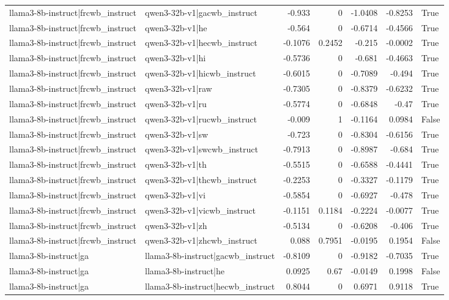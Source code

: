 \begin{table}
\begin{tabular}{l l r r r r l}
llama3-8b-instruct|frcwb_instruct & qwen3-32b-v1|gacwb_instruct & -0.933 & 0 & -1.0408 & -0.8253 & True \\
llama3-8b-instruct|frcwb_instruct & qwen3-32b-v1|he & -0.564 & 0 & -0.6714 & -0.4566 & True \\
llama3-8b-instruct|frcwb_instruct & qwen3-32b-v1|hecwb_instruct & -0.1076 & 0.2452 & -0.215 & -0.0002 & True \\
llama3-8b-instruct|frcwb_instruct & qwen3-32b-v1|hi & -0.5736 & 0 & -0.681 & -0.4663 & True \\
llama3-8b-instruct|frcwb_instruct & qwen3-32b-v1|hicwb_instruct & -0.6015 & 0 & -0.7089 & -0.494 & True \\
llama3-8b-instruct|frcwb_instruct & qwen3-32b-v1|raw & -0.7305 & 0 & -0.8379 & -0.6232 & True \\
llama3-8b-instruct|frcwb_instruct & qwen3-32b-v1|ru & -0.5774 & 0 & -0.6848 & -0.47 & True \\
llama3-8b-instruct|frcwb_instruct & qwen3-32b-v1|rucwb_instruct & -0.009 & 1 & -0.1164 & 0.0984 & False \\
llama3-8b-instruct|frcwb_instruct & qwen3-32b-v1|sw & -0.723 & 0 & -0.8304 & -0.6156 & True \\
llama3-8b-instruct|frcwb_instruct & qwen3-32b-v1|swcwb_instruct & -0.7913 & 0 & -0.8987 & -0.684 & True \\
llama3-8b-instruct|frcwb_instruct & qwen3-32b-v1|th & -0.5515 & 0 & -0.6588 & -0.4441 & True \\
llama3-8b-instruct|frcwb_instruct & qwen3-32b-v1|thcwb_instruct & -0.2253 & 0 & -0.3327 & -0.1179 & True \\
llama3-8b-instruct|frcwb_instruct & qwen3-32b-v1|vi & -0.5854 & 0 & -0.6927 & -0.478 & True \\
llama3-8b-instruct|frcwb_instruct & qwen3-32b-v1|vicwb_instruct & -0.1151 & 0.1184 & -0.2224 & -0.0077 & True \\
llama3-8b-instruct|frcwb_instruct & qwen3-32b-v1|zh & -0.5134 & 0 & -0.6208 & -0.406 & True \\
llama3-8b-instruct|frcwb_instruct & qwen3-32b-v1|zhcwb_instruct & 0.088 & 0.7951 & -0.0195 & 0.1954 & False \\
llama3-8b-instruct|ga & llama3-8b-instruct|gacwb_instruct & -0.8109 & 0 & -0.9182 & -0.7035 & True \\
llama3-8b-instruct|ga & llama3-8b-instruct|he & 0.0925 & 0.67 & -0.0149 & 0.1998 & False \\
llama3-8b-instruct|ga & llama3-8b-instruct|hecwb_instruct & 0.8044 & 0 & 0.6971 & 0.9118 & True \\

\end{tabular}
\end{table}
